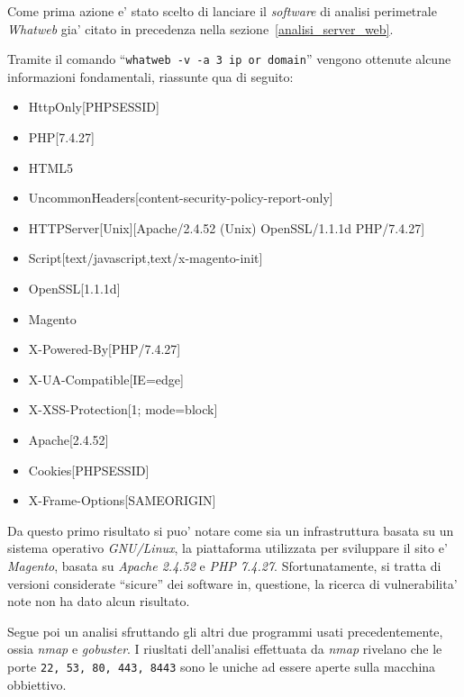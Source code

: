 \documentclass[a4paper]{report}
\newcommand{\quotes}[1]{``#1''}
\begin{document}
		Come prima azione e' stato scelto di lanciare il \emph{software} di analisi perimetrale \emph{Whatweb} gia'
		citato in precedenza nella sezione~\ref{analisi_server_web}.

		Tramite il comando \quotes{\texttt{whatweb -v -a 3 ip or domain}}
		vengono ottenute alcune informazioni fondamentali, riassunte qua di seguito:
		\begin{itemize}
			\item HttpOnly[PHPSESSID]
			\item PHP[7.4.27]
			\item HTML5
			\item UncommonHeaders[content-security-policy-report-only]
			\item HTTPServer[Unix][Apache/2.4.52 (Unix) OpenSSL/1.1.1d PHP/7.4.27]
			\item Script[text/javascript,text/x-magento-init]
			\item OpenSSL[1.1.1d]
			\item Magento
			\item X-Powered-By[PHP/7.4.27]
			\item X-UA-Compatible[IE=edge]
			\item X-XSS-Protection[1; mode=block]
			\item Apache[2.4.52]
			\item Cookies[PHPSESSID]
			\item X-Frame-Options[SAMEORIGIN]
		\end{itemize}
		Da questo primo risultato si puo' notare come sia un infrastruttura basata su un sistema operativo
		\emph{GNU/Linux}, la piattaforma utilizzata per sviluppare il sito e' \emph{Magento}, basata su \emph{Apache
		2.4.52} e \emph{PHP 7.4.27}. Sfortunatamente, si tratta di versioni considerate \quotes{sicure} dei software in,
		questione, la ricerca di vulnerabilita' note non ha dato alcun risultato.

		Segue poi un analisi sfruttando gli altri due programmi usati precedentemente, ossia \emph{nmap} e
		\emph{gobuster}.  I riusltati dell'analisi effettuata da \emph{nmap} rivelano che le porte \texttt{22, 53, 80,
		443, 8443} sono le uniche ad essere aperte sulla macchina obbiettivo.
\end{document}

